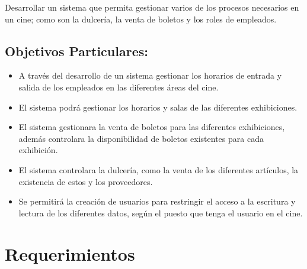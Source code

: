 \documentclass[12pt, fleqn]{report}                             %
\begin{document}
            Desarrollar un sistema que permita gestionar varios de los procesos necesarios en un cine;
            como son la dulcería, la venta de boletos y los roles de empleados.


        \subsection{Objetivos Particulares:}

            \begin{itemize}
                \item A través del desarrollo de un sistema gestionar los horarios de entrada y
                    salida de los empleados en las diferentes áreas del cine.
                
                \item El sistema podrá gestionar los horarios y salas de las diferentes exhibiciones.

                \item El sistema gestionara la venta de boletos para las diferentes exhibiciones,
                    además controlara la disponibilidad de boletos existentes para cada exhibición.

                \item El sistema controlara la dulcería, como la venta de los diferentes artículos,
                    la existencia de estos y los proveedores.

                \item Se permitirá la creación de usuarios para restringir el acceso a la escritura y
                    lectura de los diferentes datos, según el puesto que tenga el usuario en el cine.

            \end{itemize}



    \section{Requerimientos}


\end{document}
